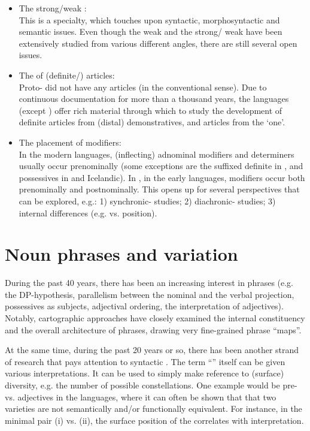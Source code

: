 \begin{refsection}
\begin{itemize}
    \item The strong/weak : \\ 
    This is a  specialty, which touches upon syntactic, morphosyntactic and semantic issues. Even though the weak  and the  strong/ weak  have been extensively studied from various different angles, there are still several open issues.  
    \item The  of (definite/) articles: \\
    Proto- did not have any articles (in the conventional sense). Due to continuous documentation for more than a thousand years, the  languages (except ) offer rich material through which to study the development of definite articles from (distal) demonstratives, and  articles from the  `one'.
    \item The placement of modifiers: \\  
    In the modern  languages, (inflecting) adnominal modifiers and determiners usually occur prenominally (some exceptions are the suffixed definite  in , and  possessives in  and Icelandic). In , in the early  languages, modifiers occur both prenominally and postnominally. This opens up for several perspectives that can be explored, e.g.: 1) synchronic- studies; 2) diachronic- studies; 3) internal differences (e.g.  vs.  position). 
\end{itemize}



\section*{Noun phrases and variation}

During the past 40 years, there has been an increasing interest in  phrases (e.g. the DP-hypothesis, parallelism between the nominal and the verbal projection, possessives as subjects, adjectival ordering, the interpretation of adjectives). Notably, cartographic approaches have closely examined the internal constituency and the overall architecture of  phrases, drawing very fine-grained  phrase ``maps''.  
 
At the same time, during the past 20 years or so, there has been another strand of research that pays attention to syntactic . The term “” itself can be given various interpretations. It can be used to simply make reference to (surface) diversity, e.g. the number of possible constellations. One example would be pre- vs.  adjectives in the  languages, where it can often be shown that that two varieties are not semantically and/or functionally equivalent. For instance, in the  minimal pair (i) vs. (ii), the surface position of the  correlates with interpretation.


\end{refsection}
